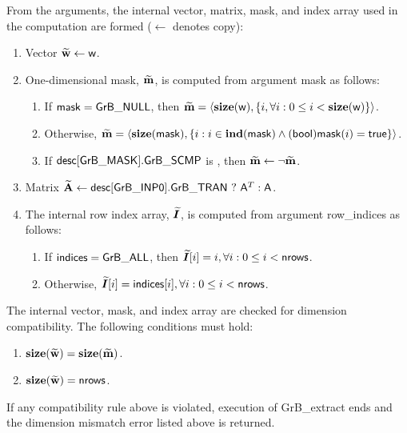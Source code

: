 From the arguments, the internal vector, matrix, mask, and index array used in 
the computation are formed ($\leftarrow$ denotes copy):
\begin{enumerate}
	\item Vector ${\bf \widetilde{w}} \leftarrow {\sf w}$.

	\item One-dimensional mask, ${\bf \widetilde{m}}$, is computed from 
    argument {\sf mask} as follows:
	\begin{enumerate}
		\item	If ${\sf mask} = {\sf GrB\_NULL}$, then ${\bf \widetilde{m}} = 
        \langle \bold{size}({\sf w}), \{i, \forall i : 0 \leq i < 
        \bold{size}({\sf w}) \} \rangle$.

		\item	Otherwise, ${\bf \widetilde{m}} = 
        \langle \bold{size}({\sf mask}), \{i :  i \in \bold{ind}({\sf mask}) \wedge
        ({\sf bool}){\sf mask}(i) = {\sf true} \} \rangle$.

		\item	If ${\sf desc[GrB\_MASK].GrB\_SCMP}$ is \true, then 
        ${\bf \widetilde{m}} \leftarrow \neg {\bf \widetilde{m}}$.
	\end{enumerate}

	\item Matrix ${\bf \widetilde{A}} \leftarrow 
    {\sf desc[GrB\_INP0].GrB\_TRAN} \ ? \ {\sf A}^T : {\sf A}$.
    
    \item The internal row index array, $\bm{\widetilde{I}}$, is computed from 
    argument {\sf row\_indices} as follows:
	\begin{enumerate}
		\item	If ${\sf indices} = {\sf GrB\_ALL}$, then 
        $\bm{\widetilde{I}}[i] = i, \forall i : 0 \leq i < {\sf nrows}$.

		\item	Otherwise, $\bm{\widetilde{I}}[i] = {\sf indices}[i], 
        \forall i : 0 \leq i < {\sf nrows}$.
    \end{enumerate}
\end{enumerate}

The internal vector, mask, and index array are checked for dimension 
compatibility.  The following conditions must hold:
\begin{enumerate}
	\item $\bold{size}({\bf \widetilde{w}}) = \bold{size}({\bf \widetilde{m}})$.

	\item $\bold{size}({\bf \widetilde{w}}) = {\sf nrows}$.
\end{enumerate}
If any compatibility rule above is violated, execution of {\sf GrB\_extract} ends 
and the dimension mismatch error listed above is returned.

